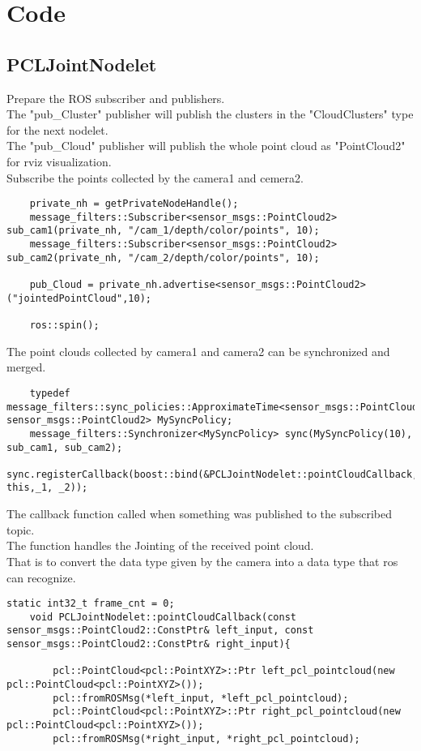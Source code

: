 \chapter{Code}
\section{PCLJointNodelet}
Prepare the ROS subscriber and publishers.\\	
The "pub\_Cluster" publisher will publish the clusters in the "CloudClusters" type for the next nodelet.\\
The "pub\_Cloud" publisher will publish the whole point cloud as "PointCloud2" for rviz visualization.\\
Subscribe the points collected by the camera1 and cemera2.\\

\begin{lstlisting}
	private_nh = getPrivateNodeHandle();
	message_filters::Subscriber<sensor_msgs::PointCloud2> sub_cam1(private_nh, "/cam_1/depth/color/points", 10);
	message_filters::Subscriber<sensor_msgs::PointCloud2> sub_cam2(private_nh, "/cam_2/depth/color/points", 10);
	
	pub_Cloud = private_nh.advertise<sensor_msgs::PointCloud2>("jointedPointCloud",10);
	
	ros::spin();
\end{lstlisting}
The point clouds collected by camera1 and camera2 can be synchronized and merged.\\
\begin{lstlisting}
	typedef message_filters::sync_policies::ApproximateTime<sensor_msgs::PointCloud2, sensor_msgs::PointCloud2> MySyncPolicy;
	message_filters::Synchronizer<MySyncPolicy> sync(MySyncPolicy(10), sub_cam1, sub_cam2);
	sync.registerCallback(boost::bind(&PCLJointNodelet::pointCloudCallback, this,_1, _2));
\end{lstlisting}

The callback function called when something was published to the subscribed topic.\\
The function handles the Jointing of the received point cloud.\\
That is to convert the data type given by the camera into a data type that ros can recognize.
\begin{lstlisting}[caption={}]
	static int32_t frame_cnt = 0;
	void PCLJointNodelet::pointCloudCallback(const sensor_msgs::PointCloud2::ConstPtr& left_input, const sensor_msgs::PointCloud2::ConstPtr& right_input){
		
		pcl::PointCloud<pcl::PointXYZ>::Ptr left_pcl_pointcloud(new pcl::PointCloud<pcl::PointXYZ>());
		pcl::fromROSMsg(*left_input, *left_pcl_pointcloud);
		pcl::PointCloud<pcl::PointXYZ>::Ptr right_pcl_pointcloud(new pcl::PointCloud<pcl::PointXYZ>());
		pcl::fromROSMsg(*right_input, *right_pcl_pointcloud);
	\end{lstlisting}
	
